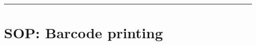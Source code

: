 \par\noindent\rule{\textwidth\color{pniblue}}{0.4pt}
\section{SOP: Barcode printing}
\label{section:sop_barcode}